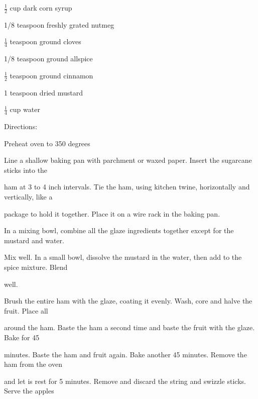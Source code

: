 \documentclass[a4paper,portrait,12pt]{book}
\begin{document}
$\frac{1}{2}$ cup dark corn syrup




1/8 teaspoon freshly grated nutmeg




$\frac{1}{4}$ teaspoon ground cloves




1/8 teaspoon ground allspice




$\frac{1}{2}$ teaspoon ground cinnamon




1 teaspoon dried mustard




$\frac{1}{4}$ cup water




Directions:




Preheat oven to 350 degrees




Line a shallow baking pan with parchment or waxed paper. Insert the sugarcane sticks into the




ham at 3 to 4 inch intervals. Tie the ham, using kitchen twine, horizontally and vertically, like a




package to hold it together. Place it on a wire rack in the baking pan.




In a mixing bowl, combine all the glaze ingredients together except for the mustard and water.




Mix well. In a small bowl, dissolve the mustard in the water, then add to the spice mixture. Blend




well.




Brush the entire ham with the glaze, coating it evenly. Wash, core and halve the fruit. Place all




around the ham. Baste the ham a second time and baste the fruit with the glaze. Bake for 45




minutes. Baste the ham and fruit again. Bake another 45 minutes. Remove the ham from the oven




and let is rest for 5 minutes. Remove and discard the string and swizzle sticks. Serve the apples
\end{document}
